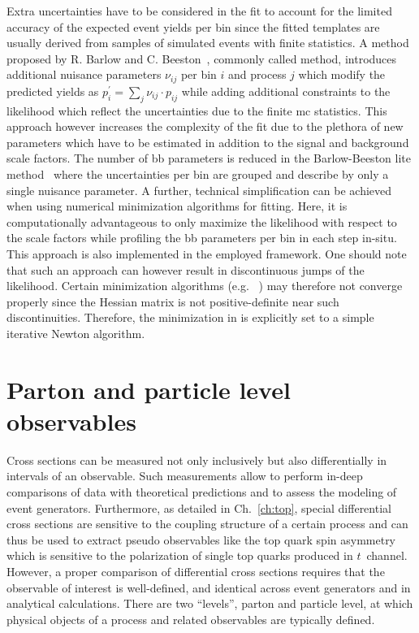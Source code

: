 Extra uncertainties have to be considered in the fit to account for the limited accuracy of the expected event yields per bin since the fitted templates are usually derived from samples of simulated events with finite statistics. A method proposed by R. Barlow and C. Beeston~\cite{Barlow:1993dm}, commonly called  method, introduces additional nuisance parameters $\nu_{ij}$ per bin $i$ and process $j$ which 
modify the predicted yields as $p_{i}^\prime=\sum_{j}\nu_{ij}\cdot p_{ij}$ while adding additional constraints to the likelihood which reflect the uncertainties due to the finite \gls{mc} statistics. This approach however increases the complexity of the fit due to the plethora of new parameters which have to be estimated in addition to the signal and background scale factors. The number of \gls{bb} parameters is reduced in the Barlow-Beeston lite method~\cite{Conway:2011in} where the uncertainties per bin are grouped and describe by only a single nuisance parameter. A further, technical simplification can be achieved when using numerical minimization algorithms for fitting. Here, it is computationally advantageous to only maximize the likelihood with respect to the scale factors while profiling the \gls{bb} parameters per bin in each step in-situ. This approach is also implemented in the employed \THETA framework. One should note that such an approach can however result in discontinuous jumps of the likelihood. Certain minimization algorithms (e.g. \MINUIT[format=hyperbf]~\cite{James:1975dr}) may therefore not converge properly since the Hessian matrix is not positive-definite near such discontinuities. Therefore, the minimization in \THETA is explicitly set to a simple iterative Newton algorithm.



\section{Parton and particle level observables}

Cross sections can be measured not only inclusively but also differentially in intervals of an observable. Such measurements allow to perform in-deep comparisons of data with theoretical predictions and to assess the modeling of event generators. Furthermore, as detailed in Ch.~\ref{ch:top}, special differential cross sections are sensitive to the coupling structure of a certain process and can thus be used to extract pseudo observables like the top quark spin asymmetry which is sensitive to the polarization of single top quarks produced in $t$~channel. However, a proper comparison of differential cross sections requires that the observable of interest is well-defined, and identical across event generators and in analytical calculations. There are two ``levels'', parton and particle level, at which physical objects of a process and related observables are typically defined. 

